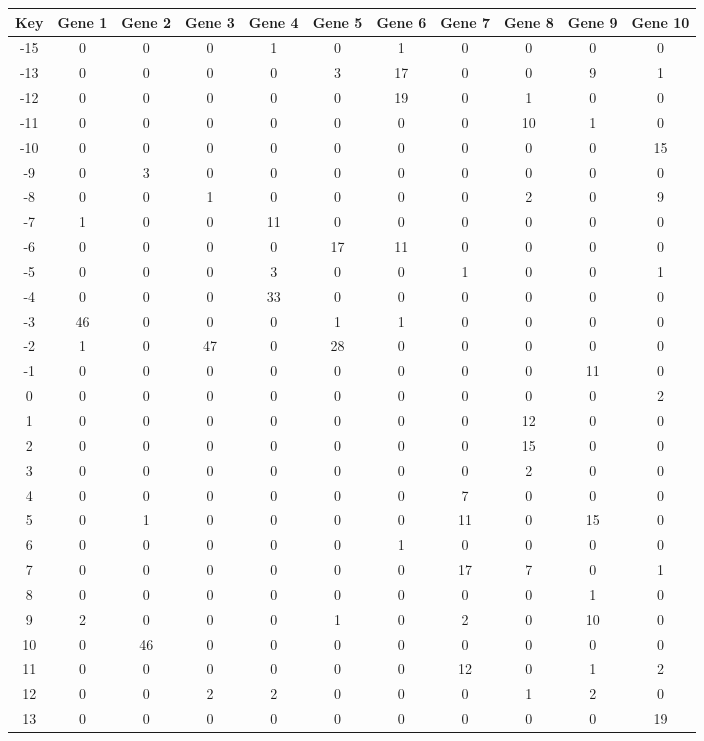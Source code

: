 \begin{tabular}{|c|c|c|c|c|c|c|c|c|c|c|}
\hline
Key & Gene 1 & Gene 2 & Gene 3 & Gene 4 & Gene 5 & Gene 6 & Gene 7 & Gene 8 & Gene 9 & Gene 10 \\
\hline
-15 & 0 & 0 & 0 & 1 & 0 & 1 & 0 & 0 & 0 & 0 \\
-13 & 0 & 0 & 0 & 0 & 3 & 17 & 0 & 0 & 9 & 1 \\
-12 & 0 & 0 & 0 & 0 & 0 & 19 & 0 & 1 & 0 & 0 \\
-11 & 0 & 0 & 0 & 0 & 0 & 0 & 0 & 10 & 1 & 0 \\
-10 & 0 & 0 & 0 & 0 & 0 & 0 & 0 & 0 & 0 & 15 \\
-9 & 0 & 3 & 0 & 0 & 0 & 0 & 0 & 0 & 0 & 0 \\
-8 & 0 & 0 & 1 & 0 & 0 & 0 & 0 & 2 & 0 & 9 \\
-7 & 1 & 0 & 0 & 11 & 0 & 0 & 0 & 0 & 0 & 0 \\
-6 & 0 & 0 & 0 & 0 & 17 & 11 & 0 & 0 & 0 & 0 \\
-5 & 0 & 0 & 0 & 3 & 0 & 0 & 1 & 0 & 0 & 1 \\
-4 & 0 & 0 & 0 & 33 & 0 & 0 & 0 & 0 & 0 & 0 \\
-3 & 46 & 0 & 0 & 0 & 1 & 1 & 0 & 0 & 0 & 0 \\
-2 & 1 & 0 & 47 & 0 & 28 & 0 & 0 & 0 & 0 & 0 \\
-1 & 0 & 0 & 0 & 0 & 0 & 0 & 0 & 0 & 11 & 0 \\
0 & 0 & 0 & 0 & 0 & 0 & 0 & 0 & 0 & 0 & 2 \\
1 & 0 & 0 & 0 & 0 & 0 & 0 & 0 & 12 & 0 & 0 \\
2 & 0 & 0 & 0 & 0 & 0 & 0 & 0 & 15 & 0 & 0 \\
3 & 0 & 0 & 0 & 0 & 0 & 0 & 0 & 2 & 0 & 0 \\
4 & 0 & 0 & 0 & 0 & 0 & 0 & 7 & 0 & 0 & 0 \\
5 & 0 & 1 & 0 & 0 & 0 & 0 & 11 & 0 & 15 & 0 \\
6 & 0 & 0 & 0 & 0 & 0 & 1 & 0 & 0 & 0 & 0 \\
7 & 0 & 0 & 0 & 0 & 0 & 0 & 17 & 7 & 0 & 1 \\
8 & 0 & 0 & 0 & 0 & 0 & 0 & 0 & 0 & 1 & 0 \\
9 & 2 & 0 & 0 & 0 & 1 & 0 & 2 & 0 & 10 & 0 \\
10 & 0 & 46 & 0 & 0 & 0 & 0 & 0 & 0 & 0 & 0 \\
11 & 0 & 0 & 0 & 0 & 0 & 0 & 12 & 0 & 1 & 2 \\
12 & 0 & 0 & 2 & 2 & 0 & 0 & 0 & 1 & 2 & 0 \\
13 & 0 & 0 & 0 & 0 & 0 & 0 & 0 & 0 & 0 & 19 \\
\hline
\end{tabular}
